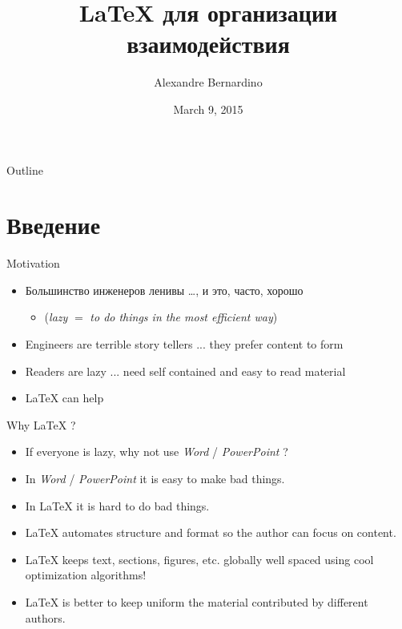 \documentclass{beamer}
\title[JEEC 2015 Workshop]{\LaTeX{} для организации взаимодействия}
\author{Alexandre Bernardino}
\institute{ISR/IST}
\date{March 9, 2015}
\begin{document}
\begin{frame}
  \titlepage
\end{frame}

\begin{frame}{Outline}
  \tableofcontents
\end{frame}

\section{Введение}

\begin{frame}{Motivation}
	\begin{itemize}
  		\item Большинство инженеров ленивы \ldots{}, и это, часто, хорошо
  		\begin{itemize}
			\item (\textit{lazy} $=$ \textit{to do things in the most efficient way})
		\end{itemize}
  		\pause
  		\item Engineers are terrible story tellers ... they prefer content to form
  		\pause
  		\item Readers are lazy ... need self contained and easy to read material
  		\pause
  		\item \LaTeX{} can help
  	\end{itemize}
\end{frame}

\begin{frame}{Why \LaTeX{} ?}
	\begin{itemize}
  		\item If everyone is lazy, why not use \textit{Word} / \textit{PowerPoint} ?
  		\pause
  		\item In \textit{Word} / \textit{PowerPoint} it is easy to make bad things.
  		\pause
  		\item In \LaTeX{} it is hard to do bad things.
  		\pause
  		\item \LaTeX{} automates structure and format so the author can focus on content.
  		\pause
  		\item \LaTeX{} keeps text, sections, figures, etc. globally well spaced using cool optimization algorithms!
  		\pause
  		\item \LaTeX{} is better to keep uniform the material contributed by different authors.
	\end{itemize}
\end{frame}
\end{document}
